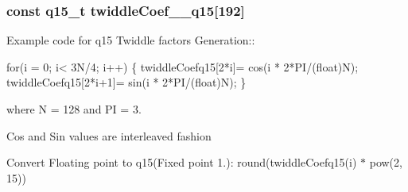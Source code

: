 \subsubsection[{\texorpdfstring{twiddle\+Coef\+\_\+128\+\_\+q15}{twiddleCoef_128_q15}}]{\setlength{\rightskip}{0pt plus 5cm}const q15\+\_\+t twiddle\+Coef\+\_\+\_\+q15\mbox{[}192\mbox{]}}\hypertarget{group__CFFT__CIFFT_gabfdd1c5cd2b3f96da5fe5f07c707a8e5}{}\label{group__CFFT__CIFFT_gabfdd1c5cd2b3f96da5fe5f07c707a8e5}
\begin{DoxyParagraph}{}
Example code for q15 Twiddle factors Generation\+:\+: 
\end{DoxyParagraph}
\begin{DoxyParagraph}{}

\begin{DoxyPre}for(i = 0; i< 3N/4; i++)
\{
   twiddleCoefq15[2*i]= cos(i * 2*PI/(float)N);
   twiddleCoefq15[2*i+1]= sin(i * 2*PI/(float)N);
\} \end{DoxyPre}
 
\end{DoxyParagraph}
\begin{DoxyParagraph}{}
where N = 128 and PI = 3. 
\end{DoxyParagraph}
\begin{DoxyParagraph}{}
Cos and Sin values are interleaved fashion 
\end{DoxyParagraph}
\begin{DoxyParagraph}{}
Convert Floating point to q15(Fixed point 1.)\+: round(twiddle\+Coefq15(i) $\ast$ pow(2, 15)) 
\end{DoxyParagraph}
